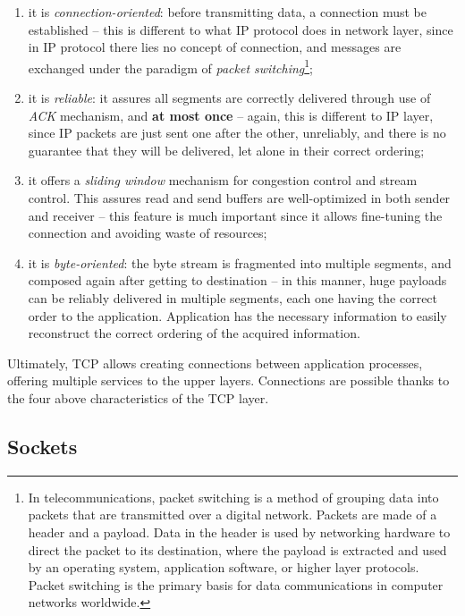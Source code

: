 \documentclass[10pt]{book}
\begin{document}
\begin{enumerate}
	\item it is \emph{connection-oriented}: before transmitting data, a
		connection must be established \--- this is different to what
		IP protocol does in network layer, since in IP protocol there
        lies no concept of connection, and messages are exchanged under the
        paradigm of \emph{packet switching}\footnote{In telecommunications,
        packet switching is a method of grouping data into packets that are
    transmitted over a digital network. Packets are made of a header and a
payload. Data in the header is used by networking hardware to direct the packet
to its destination, where the payload is extracted and used by an operating
system, application software, or higher layer protocols. Packet switching is
the primary basis for data communications in computer networks worldwide. };
	\item it is \emph{reliable}: it assures all segments are correctly
		delivered through use of \emph{ACK} mechanism, and \textbf{at
		most once} \--- again, this is different to IP layer, since IP
        packets are just sent one after the other, unreliably, and there is no
        guarantee that they will be delivered, let alone in their correct
        ordering;
	\item it offers a \emph{sliding window} mechanism for congestion control
		and stream control. This assures read and send buffers are
		well-optimized in both sender and receiver \--- this feature is
		much important since it allows fine-tuning the connection and
		avoiding waste of resources;
	\item it is \emph{byte-oriented}: the byte stream is fragmented into
		multiple segments, and composed again after getting to
		destination \--- in this manner, huge payloads can be reliably
		delivered in multiple segments, each one having the correct
		order to the application. Application has the necessary information
		to easily reconstruct the correct ordering of the acquired 
		information.
\end{enumerate}

Ultimately, TCP allows creating connections between application processes,
offering multiple services to the upper layers. Connections are possible thanks
to the four above characteristics of the TCP layer.

\subsection{Sockets}
\end{document}

